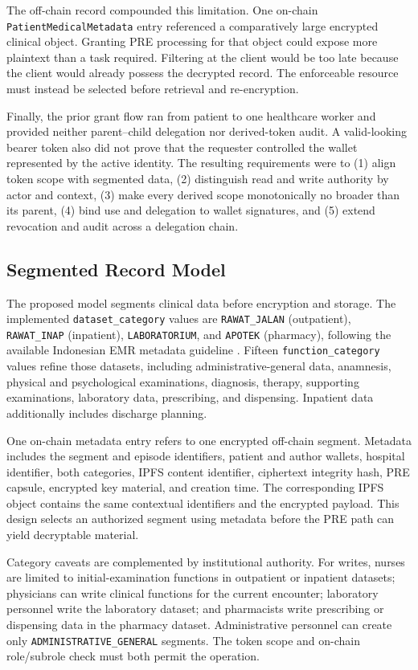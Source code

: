 The off-chain record compounded this limitation. One on-chain \texttt{PatientMedicalMetadata} entry referenced a comparatively large encrypted clinical object. Granting PRE processing for that object could expose more plaintext than a task required. Filtering at the client would be too late because the client would already possess the decrypted record. The enforceable resource must instead be selected before retrieval and re-encryption.

Finally, the prior grant flow ran from patient to one healthcare worker and provided neither parent--child delegation nor derived-token audit. A valid-looking bearer token also did not prove that the requester controlled the wallet represented by the active identity. The resulting requirements were to (1) align token scope with segmented data, (2) distinguish read and write authority by actor and context, (3) make every derived scope monotonically no broader than its parent, (4) bind use and delegation to wallet signatures, and (5) extend revocation and audit across a delegation chain.

\subsection{Segmented Record Model}

The proposed model segments clinical data before encryption and storage. The implemented \texttt{dataset\_category} values are \texttt{RAWAT\_JALAN} (outpatient), \texttt{RAWAT\_INAP} (inpatient), \texttt{LABORATORIUM}, and \texttt{APOTEK} (pharmacy), following the available Indonesian EMR metadata guideline \cite{kemenkes1423-2022}. Fifteen \texttt{function\_category} values refine those datasets, including administrative-general data, anamnesis, physical and psychological examinations, diagnosis, therapy, supporting examinations, laboratory data, prescribing, and dispensing. Inpatient data additionally includes discharge planning.

One on-chain metadata entry refers to one encrypted off-chain segment. Metadata includes the segment and episode identifiers, patient and author wallets, hospital identifier, both categories, IPFS content identifier, ciphertext integrity hash, PRE capsule, encrypted key material, and creation time. The corresponding IPFS object contains the same contextual identifiers and the encrypted payload. This design selects an authorized segment using metadata before the PRE path can yield decryptable material.

Category caveats are complemented by institutional authority. For writes, nurses are limited to initial-examination functions in outpatient or inpatient datasets; physicians can write clinical functions for the current encounter; laboratory personnel write the laboratory dataset; and pharmacists write prescribing or dispensing data in the pharmacy dataset. Administrative personnel can create only \texttt{ADMINISTRATIVE\_GENERAL} segments. The token scope and on-chain role/subrole check must both permit the operation.

